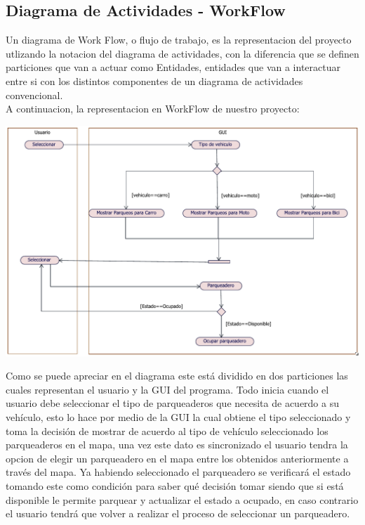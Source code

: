 \subsection{Diagrama de Actividades - WorkFlow}
\begin{flushleft}
	Un diagrama de Work Flow, o flujo de trabajo, es la representacion del proyecto utlizando la notacion del diagrama de actividades, con la diferencia que se definen particiones que van a actuar como Entidades, entidades que van a interactuar entre si con los distintos componentes de un diagrama de actividades convencional.
	\\
	A continuacion, la representacion en WorkFlow de nuestro proyecto:
	
	\begin{center}
		{\includegraphics[width=1.20\linewidth]{imgs/DiagramaWorkFlow-Proyecto/WorkFlow-Proyecto}}
	\end{center}

	Como se puede apreciar en el diagrama este está dividido en dos particiones las cuales representan el usuario y la GUI del programa. Todo inicia cuando el usuario debe seleccionar el tipo de parqueaderos que necesita de acuerdo a su vehículo, esto lo hace por medio de la GUI la cual obtiene el tipo seleccionado y toma la decisión de mostrar de acuerdo al tipo de vehículo seleccionado los parqueaderos en el mapa, una vez este dato es sincronizado el usuario tendra la opcion de elegir un parqueadero en el mapa entre los obtenidos anteriormente a través del mapa. Ya habiendo seleccionado el parqueadero se verificará el estado tomando este como condición para saber qué decisión tomar siendo que si está disponible le permite parquear y actualizar el estado a ocupado, en caso contrario el usuario tendrá que volver a realizar el proceso de seleccionar un parqueadero.
\end{flushleft}